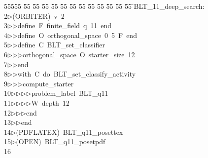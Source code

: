 %
%
\begin{tabbing}
55555 \= 55 \= 55 \= 55 \= 55 \= 55 \= 55 \= 55 \= 55 \= 55 \= 55 \= 55 \= 55 \= \>BLT\_11\_deep\_search:\\[0pt]
2\>$\triangleright$\>(ORBITER)\ v\ 2\ \\[0pt]
3\>$\triangleright$\>$\triangleright$\>define\ F\ finite\_field\ q\ 11\ end\ \\[0pt]
4\>$\triangleright$\>$\triangleright$\>define\ O\ orthogonal\_space\ 0\ 5\ F\ end\ \\[0pt]
5\>$\triangleright$\>$\triangleright$\>define\ C\ BLT\_set\_classifier\ \\[0pt]
6\>$\triangleright$\>$\triangleright$\>$\triangleright$\>orthogonal\_space\ O\ starter\_size\ 12\ \\[0pt]
7\>$\triangleright$\>$\triangleright$\>end\ \\[0pt]
8\>$\triangleright$\>$\triangleright$\>with\ C\ do\ BLT\_set\_classify\_activity\ \\[0pt]
9\>$\triangleright$\>$\triangleright$\>$\triangleright$\>compute\_starter\ \\[0pt]
10\>$\triangleright$\>$\triangleright$\>$\triangleright$\>$\triangleright$\>problem\_label\ BLT\_q11\ \\[0pt]
11\>$\triangleright$\>$\triangleright$\>$\triangleright$\>$\triangleright$\>W\ depth\ 12\ \\[0pt]
12\>$\triangleright$\>$\triangleright$\>$\triangleright$\>end\ \\[0pt]
13\>$\triangleright$\>$\triangleright$\>end\\[0pt]
14\>$\triangleright$\>(PDFLATEX)\ BLT\_q11\_posettex\\[0pt]
15\>$\triangleright$\>(OPEN)\ BLT\_q11\_posetpdf\\[0pt]
16\>\end{tabbing}
